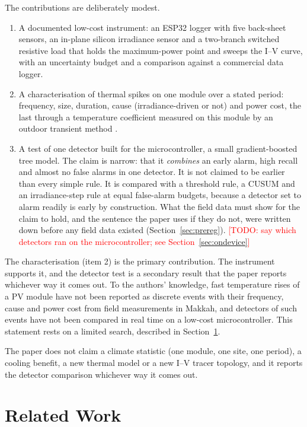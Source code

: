 \documentclass[conference]{IEEEtran}
\newcommand{\todo}[1]{\textcolor{red}{[TODO: #1]}}
\begin{document}
The contributions are deliberately modest.
\begin{enumerate}
\item A documented low-cost instrument: an ESP32 logger with five back-sheet sensors,
an in-plane silicon irradiance sensor and a two-branch switched resistive load that
holds the maximum-power point and sweeps the I--V curve, with an uncertainty budget and
a comparison against a commercial data logger.
\item A characterisation of thermal spikes on one module over a stated period: frequency,
size, duration, cause (irradiance-driven or not) and power cost, the last through a
temperature coefficient measured on this module by an outdoor transient method
\cite{king1997}.
\item A test of one detector built for the microcontroller, a small gradient-boosted
tree model. The claim is narrow: that it \emph{combines} an early alarm, high recall and
almost no false alarms in one detector. It is not claimed to be earlier than every
simple rule. It is compared with a threshold rule, a CUSUM and an irradiance-step rule
at equal false-alarm budgets, because a detector set to alarm readily is early by
construction. What the field data must show for the claim to hold, and the sentence the
paper uses if they do not, were written down before any field data existed
(Section~\ref{sec:prereg}). \todo{say which detectors ran on the microcontroller; see
Section~\ref{sec:ondevice}}
\end{enumerate}
The characterisation (item 2) is the primary contribution. The instrument supports it,
and the detector test is a secondary result that the paper reports whichever way it
comes out.
To the authors' knowledge, fast temperature rises of a PV module have not been reported
as discrete events with their frequency, cause and power cost from field measurements in
Makkah, and detectors of such events have not been compared in real time on a low-cost
microcontroller. This statement rests on a limited search, described in Section~\ref{sec:related}.

The paper does not claim a climate statistic (one module, one site, one period), a
cooling benefit, a new thermal model or a new I--V tracer topology, and it reports the
detector comparison whichever way it comes out.

\section{Related Work}\label{sec:related}
\end{document}
